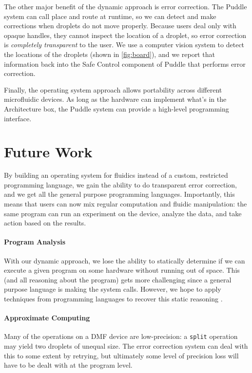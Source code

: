 \documentclass[
  10pt,
  a4paper,
  twocolumn,
]{article}
\begin{document}
The other major benefit of the dynamic approach is error correction.
The Puddle system can call place and route at runtime, so we can detect and make corrections when droplets do not move properly.
Because users deal only with opaque handles, they cannot inspect the location of a droplet, so error correction is \emph{completely transparent} to the user.
We use a computer vision system to detect the locations of the droplets (shown in \autoref{fig:board}), and we report that information back into the \textsf{Safe Control} component of Puddle that performs error correction.

Finally, the operating system approach allows portability across different microfluidic devices.
As long as the hardware can implement what's in the \textsf{Architecture} box, the Puddle system can provide a high-level programming interface.

\section*{Future Work}

By building an operating system for fluidics instead of a custom, restricted programming language, we gain the ability to do transparent error correction, and we get all the general purpose programming languages.
Importantly, this means that users can now mix regular computation and fluidic manipulation: the same program can run an experiment on the device, analyze the data, and take action based on the results.

\vspace{-0.5em}
\paragraph{Program Analysis}
With our dynamic approach, we lose the ability to statically determine if we can execute a given program on some hardware without running out of space.
This (and all reasoning about the program) gets more challenging since a general purpose language is making the system calls.
However, we hope to apply techniques from programming languages to recover this static reasoning \cite{obt18}.

\vspace{-0.5em}
\paragraph{Approximate Computing}
Many of the operations on a DMF device are low-precision: a \texttt{split} operation may yield two droplets of unequal size.
The error correction system can deal with this to some extent by retrying, but ultimately some level of precision loss will have to be dealt with at the program level.
\end{document}
